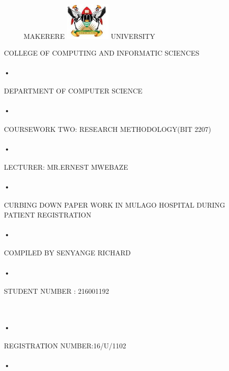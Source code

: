\documentclass[10pt,a4paper]{article}
\begin{document}
\begin{titlepage}
 \begin{figure}[h]
  \centerline{\small MAKERERE 
  \includegraphics[width=0.2\textwidth]{muklog} UNIVERSITY}
\end{figure}
\centerline{COLLEGE OF COMPUTING AND INFORMATIC SCIENCES}
\paragraph{•}
\centerline{DEPARTMENT OF COMPUTER SCIENCE\\}
\paragraph{•}

\centerline{COURSEWORK TWO: RESEARCH METHODOLOGY(BIT 2207)\\}
\paragraph{•}
\centerline{LECTURER: MR.ERNEST MWEBAZE}
\paragraph{•}
\centerline{  CURBING DOWN PAPER WORK IN MULAGO HOSPITAL   DURING PATIENT REGISTRATION }
\paragraph{•}
\centerline{COMPILED BY
 SENYANGE RICHARD}
 \paragraph{•}
\centerline{STUDENT NUMBER : 216001192}\
\paragraph{•}
\centerline{REGISTRATION NUMBER:16/U/1102}
\paragraph{•}
\end{titlepage}
\tableofcontents
\newpage
{}
\end{document}
